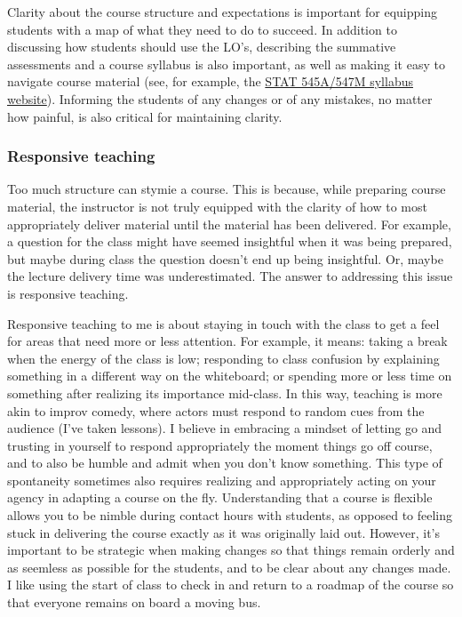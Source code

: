 \documentclass[]{article}
\begin{document}
Clarity about the course structure and expectations is important for equipping students with a map of what they need to do to succeed. In addition to discussing how students should use the LO's, describing the summative assessments and a course syllabus is also important, as well as making it easy to navigate course material (see, for example, the \href{https://stat545.stat.ubc.ca/}{STAT 545A/547M syllabus website}). Informing the students of any changes or of any mistakes, no matter how painful, is also critical for maintaining clarity.

\hypertarget{responsive-teaching}{%
\subsubsection{Responsive teaching}\label{responsive-teaching}}

Too much structure can stymie a course. This is because, while preparing course material, the instructor is not truly equipped with the clarity of how to most appropriately deliver material until the material has been delivered. For example, a question for the class might have seemed insightful when it was being prepared, but maybe during class the question doesn't end up being insightful. Or, maybe the lecture delivery time was underestimated. The answer to addressing this issue is responsive teaching.

Responsive teaching to me is about staying in touch with the class to get a feel for areas that need more or less attention. For example, it means: taking a break when the energy of the class is low; responding to class confusion by explaining something in a different way on the whiteboard; or spending more or less time on something after realizing its importance mid-class. In this way, teaching is more akin to improv comedy, where actors must respond to random cues from the audience (I've taken lessons). I believe in embracing a mindset of letting go and trusting in yourself to respond appropriately the moment things go off course, and to also be humble and admit when you don't know something. This type of spontaneity sometimes also requires realizing and appropriately acting on your agency in adapting a course on the fly. Understanding that a course is flexible allows you to be nimble during contact hours with students, as opposed to feeling stuck in delivering the course exactly as it was originally laid out. However, it's important to be strategic when making changes so that things remain orderly and as seemless as possible for the students, and to be clear about any changes made. I like using the start of class to check in and return to a roadmap of the course so that everyone remains on board a moving bus.
\end{document}
